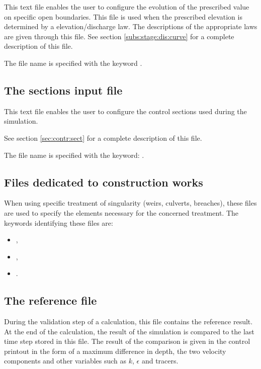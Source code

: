 This text file enables the user to configure the evolution of the prescribed
value on specific open boundaries.
This file is used when the prescribed elevation is determined
by a elevation/discharge law.
The descriptions of the appropriate laws are given through this file.
See section \ref{subs:stage:dis:curve} for a complete description of this file.

The file name is specified with the keyword .


\subsection{The sections input file}

This text file enables the user to configure the control sections used
during the simulation.

See section \ref{sec:contr:sect} for a complete description of this file.

The file name is specified with the keyword: .


\subsection{Files dedicated to construction works}

When using specific treatment of singularity (weirs, culverts, breaches), these
files are used to specify the elements necessary for the concerned treatment.
The keywords identifying these files are:

\begin{itemize}
\item {},


\item {},

\item {}.
\end{itemize}


\subsection{The reference file}

During the validation step of a calculation, this file contains the reference
result.
At the end of the calculation, the result of the simulation is compared to the
last time step stored in this file. The result of the comparison is given in
the control printout in the form of a maximum difference in depth,
the two velocity components and other variables such as $k$, $\epsilon$ and
tracers.

